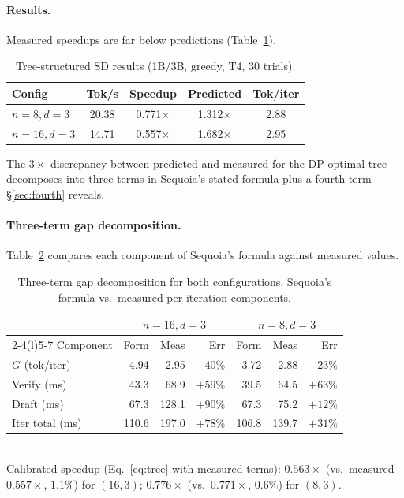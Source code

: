\documentclass[letterpaper,twocolumn,10pt]{article}
\begin{document}
\paragraph{Results.}
Measured speedups are far below predictions (Table~\ref{tab:tree_results}).

\begin{table}[t]
\centering
\small
\caption{Tree-structured SD results (1B/3B, greedy, T4, 30 trials).}
\label{tab:tree_results}
\smallskip
\begin{tabular}{@{}lcccc@{}}
\toprule
Config & Tok/s & Speedup & Predicted & Tok/iter \\
\midrule
$n{=}8, d{=}3$  & 20.38 & 0.771$\times$ & 1.312$\times$ & 2.88 \\
$n{=}16, d{=}3$ & 14.71 & 0.557$\times$ & 1.682$\times$ & 2.95 \\
\bottomrule
\end{tabular}
\end{table}

The $3\times$ discrepancy between predicted and measured for the DP-optimal tree decomposes into three terms in Sequoia's stated formula plus a fourth term \S\ref{sec:fourth} reveals.

\paragraph{Three-term gap decomposition.}
Table~\ref{tab:gap} compares each component of Sequoia's formula against measured values.

\begin{table}[t]
\centering
\small
\caption{Three-term gap decomposition for both configurations. Sequoia's formula vs.\ measured per-iteration components.}
\label{tab:gap}
\smallskip
\begin{tabular}{@{}lrrrrrr@{}}
\toprule
& \multicolumn{3}{c}{$n{=}16, d{=}3$} & \multicolumn{3}{c}{$n{=}8, d{=}3$} \\
\cmidrule(lr){2-4}\cmidrule(l){5-7}
Component & Form & Meas & Err & Form & Meas & Err \\
\midrule
$G$ (tok/iter)        & 4.94  & 2.95  & $-40\%$ & 3.72 & 2.88 & $-23\%$ \\
Verify (ms)           & 43.3  & 68.9  & $+59\%$ & 39.5 & 64.5 & $+63\%$ \\
Draft (ms)            & 67.3  & 128.1 & $+90\%$ & 67.3 & 75.2 & $+12\%$ \\
\midrule
Iter total (ms)       & 110.6 & 197.0 & $+78\%$ & 106.8 & 139.7 & $+31\%$ \\
\bottomrule
\end{tabular}
\\[3pt]
{\scriptsize Calibrated speedup (Eq.~\ref{eq:tree} with measured terms): $0.563\times$ (vs.\ measured $0.557\times$, $1.1\%$) for $(16,3)$; $0.776\times$ (vs.\ $0.771\times$, $0.6\%$) for $(8,3)$.}
\end{table}
\end{document}
